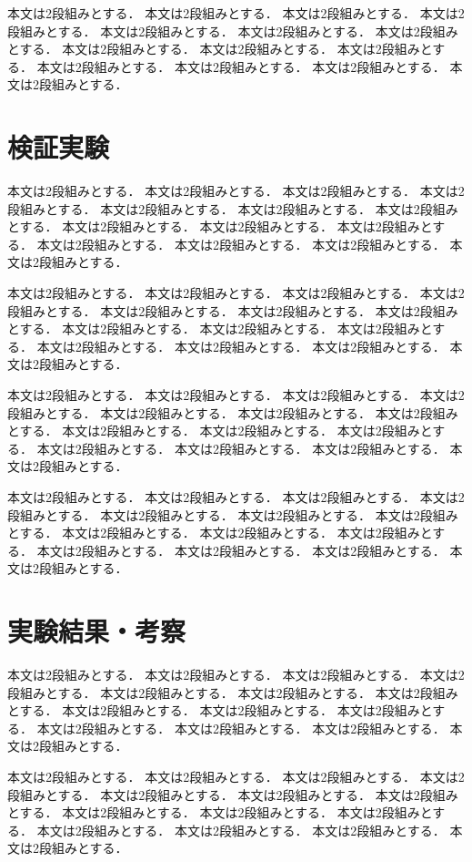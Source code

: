\documentclass{/workdir/classes/summary}
\begin{document}
本文は2段組みとする．
本文は2段組みとする．
本文は2段組みとする．
本文は2段組みとする．
本文は2段組みとする．
本文は2段組みとする．
本文は2段組みとする．
本文は2段組みとする．
本文は2段組みとする．
本文は2段組みとする．
本文は2段組みとする．
本文は2段組みとする．
本文は2段組みとする．
本文は2段組みとする．

\section{検証実験}
本文は2段組みとする．
本文は2段組みとする．
本文は2段組みとする．
本文は2段組みとする．
本文は2段組みとする．
本文は2段組みとする．
本文は2段組みとする．
本文は2段組みとする．
本文は2段組みとする．
本文は2段組みとする．
本文は2段組みとする．
本文は2段組みとする．
本文は2段組みとする．
本文は2段組みとする．

本文は2段組みとする．
本文は2段組みとする．
本文は2段組みとする．
本文は2段組みとする．
本文は2段組みとする．
本文は2段組みとする．
本文は2段組みとする．
本文は2段組みとする．
本文は2段組みとする．
本文は2段組みとする．
本文は2段組みとする．
本文は2段組みとする．
本文は2段組みとする．
本文は2段組みとする．

本文は2段組みとする．
本文は2段組みとする．
本文は2段組みとする．
本文は2段組みとする．
本文は2段組みとする．
本文は2段組みとする．
本文は2段組みとする．
本文は2段組みとする．
本文は2段組みとする．
本文は2段組みとする．
本文は2段組みとする．
本文は2段組みとする．
本文は2段組みとする．
本文は2段組みとする．

本文は2段組みとする．
本文は2段組みとする．
本文は2段組みとする．
本文は2段組みとする．
本文は2段組みとする．
本文は2段組みとする．
本文は2段組みとする．
本文は2段組みとする．
本文は2段組みとする．
本文は2段組みとする．
本文は2段組みとする．
本文は2段組みとする．
本文は2段組みとする．
本文は2段組みとする．

\section{実験結果・考察}
本文は2段組みとする．
本文は2段組みとする．
本文は2段組みとする．
本文は2段組みとする．
本文は2段組みとする．
本文は2段組みとする．
本文は2段組みとする．
本文は2段組みとする．
本文は2段組みとする．
本文は2段組みとする．
本文は2段組みとする．
本文は2段組みとする．
本文は2段組みとする．
本文は2段組みとする．

本文は2段組みとする．
本文は2段組みとする．
本文は2段組みとする．
本文は2段組みとする．
本文は2段組みとする．
本文は2段組みとする．
本文は2段組みとする．
本文は2段組みとする．
本文は2段組みとする．
本文は2段組みとする．
本文は2段組みとする．
本文は2段組みとする．
本文は2段組みとする．
本文は2段組みとする．
\end{document}
